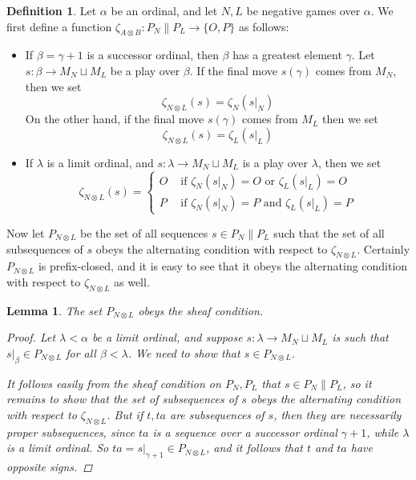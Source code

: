 \documentclass[11pt]{article} %
\theoremstyle{plain} %
\newtheorem{lemma}[theorem]{Lemma}
\theoremstyle{definition} %
\newtheorem{definition}[theorem]{Definition}
\theoremstyle{exercisestyle}
\newcommand*\from{\colon}
\newcommand{\cmap}[3]{#1\from{}#2\to{}#3}
\newcommand{\tensor}{\otimes}
\newcommand{\cprd}{\sqcup}
\begin{document}
\begin{definition}
  Let $\alpha$ be an ordinal, and let $N,L$ be negative games over $\alpha$.  We first define a function $\cmap{\zeta_{A\tensor B}}{P_N\|P_L}{\{O,P\}}$ as follows:
  \begin{itemize}
    \item If $\beta=\gamma+1$ is a successor ordinal, then $\beta$ has a greatest element $\gamma$.  Let $\cmap{s}{\beta}{M_N\cprd M_L}$ be a play over $\beta$.  If the final move $s(\gamma)$ comes from $M_N$, then we set
      \[
        \zeta_{N\tensor L}(s)=\zeta_N(s\vert_N)
      \]
      On the other hand, if the final move $s(\gamma)$ comes from $M_L$ then we set
      \[
        \zeta_{N\tensor L}(s)=\zeta_L(s\vert_L)
      \]
    \item If $\lambda$ is a limit ordinal, and $\cmap{s}{\lambda}{M_N\cprd M_L}$ is a play over $\lambda$, then we set
      \[
        \zeta_{N\tensor L}(s)=
        \begin{cases}
          O&\textrm{ if $\zeta_N(s\vert_N)=O$ or $\zeta_L(s\vert_L)=O$}\\
          P&\textrm{ if $\zeta_N(s\vert_N)=P$ and $\zeta_L(s\vert_L)=P$}
        \end{cases}
      \]
  \end{itemize}

  Now let $P_{N\tensor L}$ be the set of all sequences $s\in P_N\|P_L$ such that the set of all subsequences of $s$ obeys the alternating condition with respect to $\zeta_{N\tensor L}$.  Certainly $P_{N\tensor L}$ is prefix-closed, and it is easy to see that it obeys the alternating condition with respect to $\zeta_{N\tensor L}$ as well.
\end{definition}

\begin{lemma}
  \label{tensor-is-sheaf}
  The set $P_{N\tensor L}$ obeys the sheaf condition.
  \begin{proof}
    Let $\lambda<\alpha$ be a limit ordinal, and suppose $\cmap{s}{\lambda}{M_N\cprd M_L}$ is such that $s\vert_\beta\in P_{N\tensor L}$ for all $\beta<\lambda$.  We need to show that $s\in P_{N\tensor L}$.  

    It follows easily from the sheaf condition on $P_N,P_L$ that $s\in P_N\|P_L$, so it remains to show that the set of subsequences of $s$ obeys the alternating condition with respect to $\zeta_{N\tensor L}$.  But if $t,ta$ are subsequences of $s$, then they are necessarily \emph{proper} subsequences, since $ta$ is a sequence over a successor ordinal $\gamma+1$, while $\lambda$ is a limit ordinal.  So $ta=s\vert_{\gamma+1}\in P_{N\tensor L}$, and it follows that $t$ and $ta$ have opposite signs.
  \end{proof}
\end{lemma}
\end{document}
